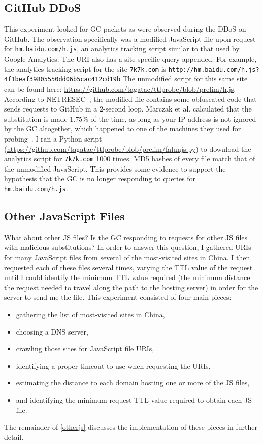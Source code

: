 \subsection{GitHub DDoS}
This experiment looked for GC packets as were observed during the DDoS on GitHub.
The observation specifically was a modified JavaScript file upon request for \texttt{hm.baidu.com/h.js}, an analytics tracking script similar to that used by Google Analytics.
The URI also has a site-specific query appended.
For example, the analytics tracking script for the site \texttt{7k7k.com} is \texttt{http://hm.baidu.com/\allowbreak h.js?4f1beaf39805550dd06b5cac412cd19b}
The unmodified script for this same site can be found here: \url{https://github.com/tagatac/ttlprobe/blob/prelim/h.js}.
According to \mbox{NETRESEC}~\cite{Hjelmvik2015}, the modified file contains some obfuscated code that sends requests to GitHub in a 2-second loop.
Marczak et al. calculated that the substitution is made 1.75\% of the time, as long as your IP address is not ignored by the GC altogether, which happened to one of the machines they used for probing~\cite{Marczak2015}.
I ran a Python script (\url{https://github.com/tagatac/ttlprobe/blob/prelim/falunjs.py}) to download the analytics script for \texttt{7k7k.com} 1000 times.
MD5 hashes of every file match that of the unmodified JavaScript.
This provides some evidence to support the hypothesis that the GC is no longer responding to queries for \texttt{hm.baidu.com/h.js}.
\subsection{Other JavaScript Files}\label{otherjs}
What about other JS files?
Is the GC responding to requests for other JS files with malicious substitutions?
In order to answer this question, I gathered URIs for many JavaScript files from several of the most-visited sites in China.
I then requested each of these files several times, varying the TTL value of the request until I could identify the minimum TTL value required (the minimum distance the request needed to travel along the path to the hosting server) in order for the server to send me the file.
This experiment consisted of four main pieces:
\begin{itemize}\addtolength{\itemsep}{-.35\baselineskip}
	\item gathering the list of most-visited sites in China,
	\item choosing a DNS server,
	\item crawling those sites for JavaScript file URIs,
	\item identifying a proper timeout to use when requesting the URIs,
	\item estimating the distance to each domain hosting one or more of the JS files,
	\item and identifying the minimum request TTL value required to obtain each JS file.
\end{itemize}
The remainder of \autoref{otherjs} discusses the implementation of these pieces in further detail.
